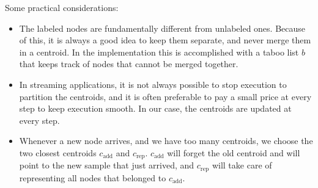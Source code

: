 \documentclass{article}
\begin{document}
Some practical considerations: 
\begin{itemize}
	\item The labeled nodes are fundamentally different from unlabeled ones.
	Because of this, it is always a good idea to keep them separate, and never merge them in a centroid. In the implementation this is accomplished with a taboo list $b$ that keeps track of nodes that cannot be merged together.
	\item In streaming applications, it is not always possible to stop execution to partition the centroids,
	and it is often preferable to pay a small price at every step to keep execution smooth. In our case, the centroids are updated at every step.
	\item Whenever a new node arrives, and we have too many centroids, we choose the two closest centroids $c_{\mathrm{add}}$ and $c_{\mathrm{rep}}$.
	$c_{\mathrm{add}}$ will forget the old centroid and will point to the
	new sample that just arrived, and $c_{\mathrm{rep}}$
	will take care of representing all nodes that belonged to $c_{\mathrm{add}}$.
\end{itemize}





\end{document}
